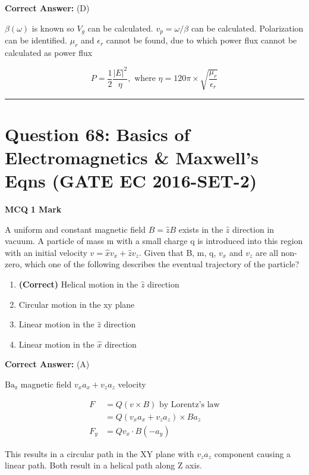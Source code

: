 \documentclass[11pt,a4paper]{article}
\begin{document}
\noindent \textbf{Correct Answer:} (D)

\begin{tcolorbox}[solbox, title=Detailed Solution -- Question 67]
$\beta(\omega)$ is known so $V_{g}$ can be calculated. 
$v_{p}=\omega / \beta$ can be calculated.
 Polarization can be identified.
$\mu_{r}$ and $\epsilon_{r}$ cannot be found, due to which power flux cannot be calculated as power flux 

\[
P=\frac{1}{2} \frac{|E|^{2}}{\eta}, \text{ where }\eta=120 \pi \times \sqrt{\frac{\mu_{r}}{\epsilon_{r}}}
\]
\end{tcolorbox}

\vspace{1.5em}
\hrule
\vspace{1.5em}

\section*{Question 68: Basics of Electromagnetics \& Maxwell's Eqns (GATE EC 2016-SET-2)}
\noindent \textbf{\color{primary}MCQ} \hfill \textbf{\color{secondary}1 Mark}


\noindent A uniform and constant magnetic field $B=\hat{z}B$ exists in the $\hat{z}$ direction in vacuum. A particle of mass m with a small charge q is introduced into this region with an initial velocity $v=\hat{x}v_{x}+\hat{z}v_{z}$. Given that B, m, q, $v_{x}$ and $v_{z}$ are all non-zero, which one of the following describes the eventual trajectory of the particle?


\begin{enumerate}[label=(\Alph*)]
    \item \textbf{(Correct)} Helical motion in the $\hat{z}$ direction
    \item Circular motion in the xy plane
    \item Linear motion in the $\hat{z}$ direction
    \item Linear motion in the $\hat{x}$ direction
\end{enumerate}

\noindent \textbf{Correct Answer:} (A)

\begin{tcolorbox}[solbox, title=Detailed Solution -- Question 68]
$\mathrm{Ba}_{\mathrm{z}}$ magnetic field 
$v_{x} a_{x}+v_{z} a_{z}$ velocity 

\[
\begin{aligned} F&=Q(v \times B) \text{ by Lorentz's law}\\ &=Q\left(v_{x} a_{x}+v_{z} a_{z}\right) \times B a_{z} \\ F_{y} &=Q v_{x} \cdot B\left(-a_{y}\right) \end{aligned}
\]

 This results in a circular path in the XY plane with  $v_{z} a_{z}$ component causing a linear path. 
 Both result in a helical path along Z axis.
\end{tcolorbox}
\end{document}
